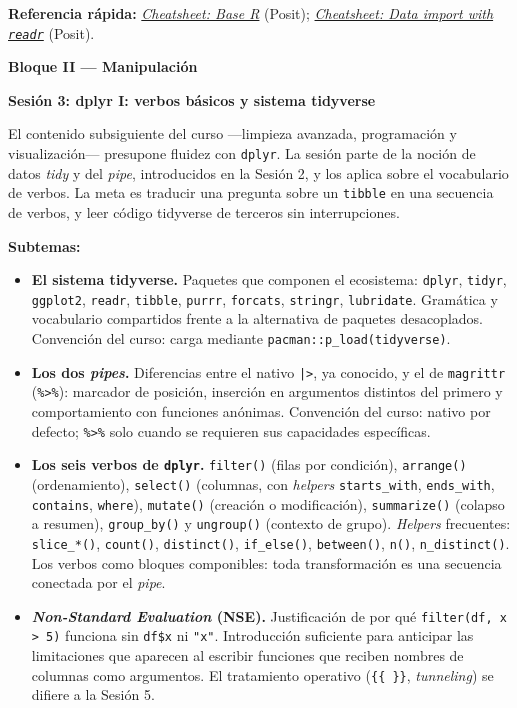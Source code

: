 \documentclass[11pt,letterpaper]{article}
\newcommand{\bloqueCurso}[1]{%
  \clearpage%
  \vspace*{0.5cm}%
  {\centering\color{main}\fontsize{26pt}{32pt}\selectfont\bfseries #1\par}%
  \vspace{0.8cm}%
}
\newcommand{\sesion}[2]{%
  \bigskip%
  {\color{main}\Large\bfseries Sesión #1: #2\par}%
  \smallskip%
}
\newcommand{\cheatsheet}[2]{%
  \href{https://rstudio.github.io/cheatsheets/#1.pdf}{\textit{Cheatsheet: #2}}%
}
\begin{document}
\medskip
\noindent\textbf{Referencia rápida:} \cheatsheet{base-r}{Base R} (Posit); \cheatsheet{data-import}{Data import with \texttt{readr}} (Posit).

\bloqueCurso{Bloque II --- Manipulación}

\sesion{3}{dplyr I: verbos básicos y sistema tidyverse}

El contenido subsiguiente del curso ---limpieza avanzada, programación y visualización--- presupone fluidez con \texttt{dplyr}. La sesión parte de la noción de datos \textit{tidy} y del \textit{pipe}, introducidos en la Sesión 2, y los aplica sobre el vocabulario de verbos. La meta es traducir una pregunta sobre un \texttt{tibble} en una secuencia de verbos, y leer código tidyverse de terceros sin interrupciones.

\textbf{Subtemas:}

\begin{itemize}[leftmargin=*, itemsep=2pt]
    \item \textbf{El sistema tidyverse.} Paquetes que componen el ecosistema: \texttt{dplyr}, \texttt{tidyr}, \texttt{ggplot2}, \texttt{readr}, \texttt{tibble}, \texttt{purrr}, \texttt{forcats}, \texttt{stringr}, \texttt{lubridate}. Gramática y vocabulario compartidos frente a la alternativa de paquetes desacoplados. Convención del curso: carga mediante \texttt{pacman::p\_load(tidyverse)}.
    \item \textbf{Los dos \textit{pipes}.} Diferencias entre el nativo \texttt{|>}, ya conocido, y el de \texttt{magrittr} (\texttt{\%>\%}): marcador de posición, inserción en argumentos distintos del primero y comportamiento con funciones anónimas. Convención del curso: nativo por defecto; \texttt{\%>\%} solo cuando se requieren sus capacidades específicas.
    \item \textbf{Los seis verbos de \texttt{dplyr}.} \texttt{filter()} (filas por condición), \texttt{arrange()} (ordenamiento), \texttt{select()} (columnas, con \textit{helpers} \texttt{starts\_with}, \texttt{ends\_with}, \texttt{contains}, \texttt{where}), \texttt{mutate()} (creación o modificación), \texttt{summarize()} (colapso a resumen), \texttt{group\_by()} y \texttt{ungroup()} (contexto de grupo). \textit{Helpers} frecuentes: \texttt{slice\_*()}, \texttt{count()}, \texttt{distinct()}, \texttt{if\_else()}, \texttt{between()}, \texttt{n()}, \texttt{n\_distinct()}. Los verbos como bloques componibles: toda transformación es una secuencia conectada por el \textit{pipe}.
    \item \textbf{\textit{Non-Standard Evaluation} (NSE).} Justificación de por qué \texttt{filter(df, x > 5)} funciona sin \texttt{df\$x} ni \texttt{"x"}. Introducción suficiente para anticipar las limitaciones que aparecen al escribir funciones que reciben nombres de columnas como argumentos. El tratamiento operativo (\texttt{\{\{~\}\}}, \textit{tunneling}) se difiere a la Sesión 5.
\end{itemize}
\end{document}
